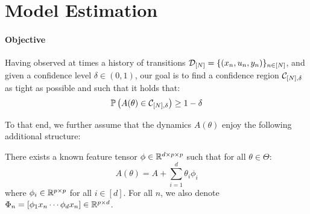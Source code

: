 \documentclass{article}
\begin{document}
\section{Model Estimation}

\paragraph{Objective}
Having observed at times a history of transitions $\mathcal{D}_{[N]} = \{(x_n, u_n, y_n)\}_{n\in[N]}$, and given a confidence level $\delta\in(0, 1)$, our goal is to find a confidence region $\mathcal{C}_{[N],\delta}$ as tight as possible and such that it holds that:
\begin{align}
\mathbb{P}\left(A(\theta)\in \mathcal{C}_{[N],\delta}\right) \geq 1-\delta
\label{eq:polytope}
\end{align}



To that end, we further assume that the dynamics $A(\theta)$ enjoy the following additional structure:
\begin{assumption}
\label{assumpt:linear_param}
There exists a known feature tensor $\phi\in \mathbb{R}^{d \times p \times p}$ such that for all $\theta\in\Theta$:
\begin{equation}
    A(\theta) = A + %
    \sum_{i=1}^d \theta_i\phi_i
\end{equation}
where $\phi_i\in\mathbb{R}^{p\times p}$ for all $i\in[d]$. For all $n$, we also denote $\Phi_n = [\phi_1 x_n \cdots \phi_d x_n]\in\mathbb{R}^{p\times d}$.
\end{assumption}
\end{document}
